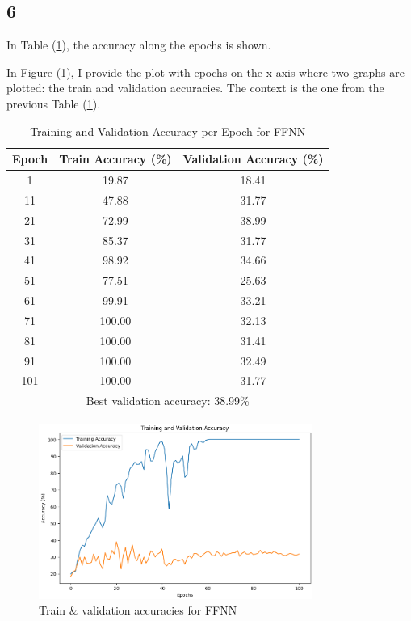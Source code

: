 \documentclass[11pt]{scrartcl}
\begin{document}
\subsection*{6}

In Table (\ref{tab:task1-accuracy}),
the accuracy along the epochs is shown.

In Figure (\ref{fig:task1-accuracy}), 
I provide the plot with epochs on the x-axis where two graphs are plotted:
the train and validation accuracies.
The context is the one from the previous Table (\ref{tab:task1-accuracy}). 


\begin{table}[htbp]
\centering
\caption{Training and Validation Accuracy per Epoch for FFNN}
\begin{tabular}{ccc}
\toprule
\textbf{Epoch} & \textbf{Train Accuracy (\%)} & \textbf{Validation Accuracy (\%)} \\
\midrule
1    & 19.87  & 18.41  \\
11   & 47.88  & 31.77  \\
21   & 72.99  & 38.99  \\
31   & 85.37  & 31.77  \\
41   & 98.92  & 34.66  \\
51   & 77.51  & 25.63  \\
61   & 99.91  & 33.21  \\
71   & 100.00 & 32.13  \\
81   & 100.00 & 31.41  \\
91   & 100.00 & 32.49  \\
101  & 100.00 & 31.77  \\
\midrule
\multicolumn{3}{c}{Best validation accuracy: 38.99\%} \\
\bottomrule
\end{tabular}
\label{tab:task1-accuracy}
\end{table}

\begin{figure}[htbp]
\centering
\includegraphics[width=0.8\textwidth]{./figures/task1-accuracy.png}
\caption{Train \& validation accuracies for FFNN}
\label{fig:task1-accuracy}
\end{figure}
\end{document}
